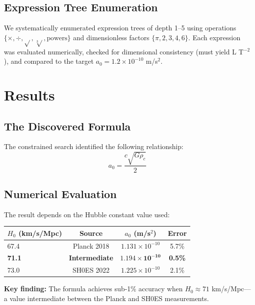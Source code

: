 \documentclass[12pt,preprint]{aastex631}
\begin{document}
\subsection{Expression Tree Enumeration}

We systematically enumerated expression trees of depth 1--5 using operations $\{\times, \div, \sqrt{}, \sqrt[3]{}, \text{powers}\}$ and dimensionless factors $\{\pi, 2, 3, 4, 6\}$. Each expression was evaluated numerically, checked for dimensional consistency (must yield L T$^{-2}$), and compared to the target $a_0 = 1.2 \times 10^{-10}$ m/s$^2$.

\section{Results}
\label{sec:results}

\subsection{The Discovered Formula}

The constrained search identified the following relationship:
\begin{equation}
\boxed{a_0 = \frac{c \sqrt{G \rho_c}}{2}}
\label{eq:zimmerman}
\end{equation}

\subsection{Numerical Evaluation}

The result depends on the Hubble constant value used:

\begin{table}[h]
\centering
\begin{tabular}{lccc}
\toprule
$H_0$ (km/s/Mpc) & Source & $a_0$ (m/s$^2$) & Error \\
\midrule
67.4 & Planck 2018 & $1.131 \times 10^{-10}$ & 5.7\% \\
\textbf{71.1} & \textbf{Intermediate} & $\mathbf{1.194 \times 10^{-10}}$ & \textbf{0.5\%} \\
73.0 & SH0ES 2022 & $1.225 \times 10^{-10}$ & 2.1\% \\
\bottomrule
\end{tabular}
\end{table}

\textbf{Key finding:} The formula achieves sub-1\% accuracy when $H_0 \approx 71$ km/s/Mpc---a value intermediate between the Planck and SH0ES measurements.
\end{document}
